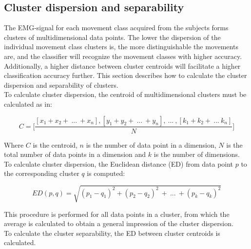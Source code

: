 \subsection{Cluster dispersion and separability}
The EMG-signal for each movement class acquired from the subjects forms clusters of multidimensional data points. The lower the dispersion of the individual movement class clusters is, the more distinguishable the movements are, and the classifier will recognize the movement classes with higher accuracy. Additionally, a higher distance between cluster centroids will facilitate a higher classification accuracy further. This section describes how to calculate the cluster dispersion and separability of clusters. \\
To calculate cluster dispersion, the centroid of multidimensional clusters must be calculated as in:

\begin{equation} \label{eq:centroid}
C = \Bigg[ \frac{[x_1+x_2 +~...~+ x_n],[y_1+y_2 +~...~+ y_n] ,~...~,[k_1+k_2 +~...~k_n]}{N} \Bigg]
\end{equation}

Where $C$ is the centroid, $n$ is the number of data point in a dimension, $N$ is the total number of data points in a dimension and $k$ is the number of dimensions. To calculate cluster dispersion, the Euclidean distance (ED) from data point $p$ to the corresponding cluster $q$ is computed: %

\begin{equation} \label{eq:euclidiandistance}
ED(p,q) = \sqrt{(p_1-q_1)^2 + (p_2-q_2)^2~+~...~+ (p_k-q_k)^2}
\end{equation} 

This procedure is performed for all data points in a cluster, from which the average is calculated to obtain a general impression of the cluster dispersion.\\
To calculate the cluster separability, the ED between cluster centroids is calculated.  


